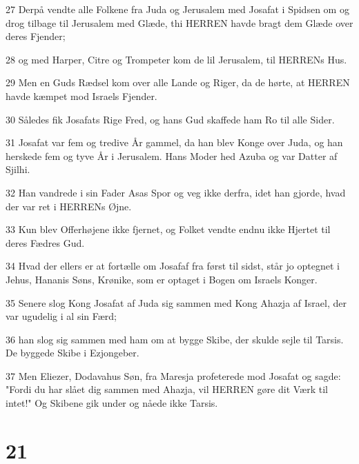 \par 27 Derpå vendte alle Folkene fra Juda og Jerusalem med Josafat i Spidsen om og drog tilbage til Jerusalem med Glæde, thi HERREN havde bragt dem Glæde over deres Fjender;
\par 28 og med Harper, Citre og Trompeter kom de lil Jerusalem, til HERRENs Hus.
\par 29 Men en Guds Rædsel kom over alle Lande og Riger, da de hørte, at HERREN havde kæmpet mod Israels Fjender.
\par 30 Således fik Josafats Rige Fred, og hans Gud skaffede ham Ro til alle Sider.
\par 31 Josafat var fem og tredive År gammel, da han blev Konge over Juda, og han herskede fem og tyve År i Jerusalem. Hans Moder hed Azuba og var Datter af Sjilhi.
\par 32 Han vandrede i sin Fader Asas Spor og veg ikke derfra, idet han gjorde, hvad der var ret i HERRENs Øjne.
\par 33 Kun blev Offerhøjene ikke fjernet, og Folket vendte endnu ikke Hjertet til deres Fædres Gud.
\par 34 Hvad der ellers er at fortælle om Josafaf fra først til sidst, står jo optegnet i Jehus, Hananis Søns, Krønike, som er optaget i Bogen om Israels Konger.
\par 35 Senere slog Kong Josafat af Juda sig sammen med Kong Ahazja af Israel, der var ugudelig i al sin Færd;
\par 36 han slog sig sammen med ham om at bygge Skibe, der skulde sejle til Tarsis. De byggede Skibe i Ezjongeber.
\par 37 Men Eliezer, Dodavahus Søn, fra Maresja profeterede mod Josafat og sagde: "Fordi du har slået dig sammen med Ahazja, vil HERREN gøre dit Værk til intet!" Og Skibene gik under og nåede ikke Tarsis.

\chapter{21}


